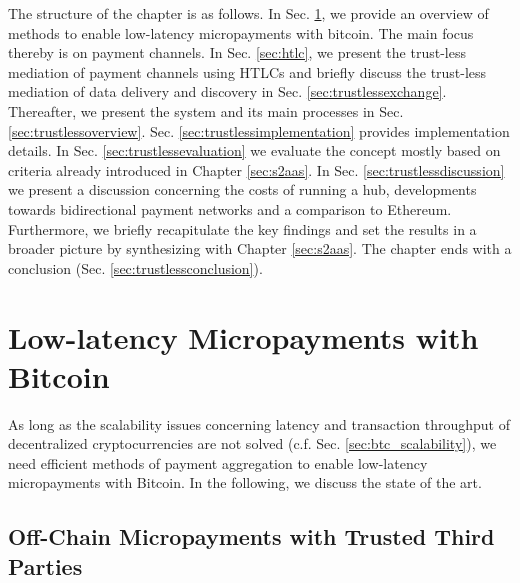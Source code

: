 The structure of the chapter is as follows. In Sec. \ref{sec:micropayments}, we provide an overview of methods to enable low-latency micropayments with bitcoin. The main focus thereby is on payment channels. In Sec. \ref{sec:htlc}, we present the trust-less mediation of payment channels using \ac{HTLC}s and briefly discuss the trust-less mediation of data delivery and discovery in Sec. \ref{sec:trustlessexchange}. Thereafter, we present the system and its main processes in Sec. \ref{sec:trustlessoverview}. Sec. \ref{sec:trustlessimplementation} provides implementation details. In Sec. \ref{sec:trustlessevaluation} we evaluate the concept mostly based on criteria already introduced in Chapter \ref{sec:s2aas}. In Sec. \ref{sec:trustlessdiscussion} we present a discussion concerning the costs of running a hub, developments towards bidirectional payment networks and a comparison to Ethereum. Furthermore, we briefly recapitulate the key findings and set the results in a broader picture by synthesizing with Chapter \ref{sec:s2aas}. The chapter ends with a conclusion (Sec. \ref{sec:trustlessconclusion}).


\section{Low-latency Micropayments with Bitcoin}
\label{sec:micropayments}

As long as the scalability issues concerning latency and transaction throughput of decentralized cryptocurrencies are not solved (c.f. Sec. \ref{sec:btc_scalability}), we need efficient methods of payment aggregation to enable low-latency micropayments with Bitcoin. In the following, we discuss the state of the art. 


\subsection{Off-Chain Micropayments with Trusted Third Parties}

